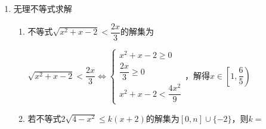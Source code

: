 \begin{enumerate}
\begin{enumerate}
\begin{jieda}
            设$t = -\dfrac{1}{x}$，故当$t \in \left(-\dfrac{1}{3}, -\dfrac{1}{2}\right) \cup \left(\dfrac{1}{2}, 1\right)$，即$-\dfrac{1}{t} \in (-2, -1) \cup (2, 3)$时，满足不等式$\dfrac{kt}{at-1} + \dfrac{bt-1}{ct-1} < 0$。因此关于$x$的不等式$\dfrac{kx}{ax-1} + \dfrac{bx-1}{cx-1} < 0$的解集为$\left(-\dfrac{1}{2}, -\dfrac{1}{3}\right) \cup \left(\dfrac{1}{2}, 1\right)$
        \end{jieda}
    \end{enumerate}
    \item 无理不等式求解
    \begin{enumerate}
        \item 不等式$\sqrt{x^2+x-2} < \dfrac{2x}{3}$的解集为\blkda{$\left[1, \dfrac{6}{5}\right)$}
        \begin{jieda}
            $\sqrt{x^2+x-2} < \dfrac{2x}{3} \Longleftrightarrow \left \{\begin{array}{l}
                 x^2+x-2 \geq 0  \\
                 \dfrac{2x}{3} \geq 0 \\
                 x^2+x-2 < \dfrac{4x^2}{9}
            \end{array} \right.$，解得$x \in \left[1, \dfrac{6}{5}\right)$
        \end{jieda}
        \item 若不等式$2\sqrt{4-x^2} \leq k(x+2)$的解集为$[0, n] \cup \{-2\}$，则$k = $
        \begin{jieda}
\end{jieda}
\end{enumerate}
\end{enumerate}
